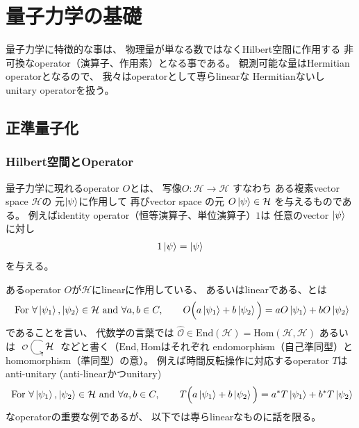 \section{量子力学の基礎}

量子力学に特徴的な事は、
物理量が単なる数ではなくHilbert空間に作用する
非可換なoperator（演算子、作用素）となる事である。
観測可能な量はHermitian operatorとなるので、
我々はoperatorとして専らlinearな
Hermitianないしunitary operatorを扱う。

\subsection{正準量子化}

\subsubsection{Hilbert空間とOperator}

量子力学に現れるoperator $O$とは、
写像$O: \mathcal{H} \to \mathcal{H}$
すなわち
ある複素vector space $\mathcal{H}$の
元$\ket{\psi}$に作用して
再びvector space の元
$O\ket{\psi} \in \mathcal{H}$
を与えるものである。
例えばidentity operator（恒等演算子、単位演算子）$1$は
任意のvector $\ket{\psi}$に対し
\begin{align}
    1 \ket{\psi} = \ket{\psi}
\end{align}
を与える。

あるoperator $O$が$\mathcal{H}$にlinearに作用している、
あるいはlinearである、とは
\begin{align}
    \text{ For }
        \forall \ket{\psi_1}, \ket{\psi_2}
        \in \mathcal{H}
    \text{ and }
        \forall a,b\in C
    ,\qquad
        O\Big(
            a \ket{\psi_1}
            +
            b \ket{\psi_2}
        \Big)
    =
        a O \ket{\psi_1}
        +
        b O \ket{\psi_2}
\label{linearity of an operator}
\end{align}
であることを言い、
代数学の言葉では
$\hat{ \mathcal{O} } \in \mathrm{End}(\mathcal{H})
= \mathrm{Hom}(\mathcal{H}, \mathcal{H}) $
あるいは
$\xymatrix{
    \mathcal{H}\ar@(ul,dl)[]_{ \hat{\mathcal{O}} }
}$
などと書く（$\mathrm{End}, \mathrm{Hom}$はそれぞれ
endomorphism（自己準同型）とhomomorphism（準同型）の意）。
例えば時間反転操作に対応するoperator $T$は
anti-unitary (anti-linearかつunitary)
\begin{align}
    \text{ For }
        \forall \ket{\psi_1}, \ket{\psi_2}
        \in \mathcal{H}
    \text{ and }
        \forall a,b\in C
    ,\qquad
        T\Big(
            a \ket{\psi_1}
            +
            b \ket{\psi_2}
        \Big)
    =
        a^* T \ket{\psi_1}
        +
        b^* T \ket{\psi_2}
\end{align}
なoperatorの重要な例であるが、
以下では専らlinearなものに話を限る。

